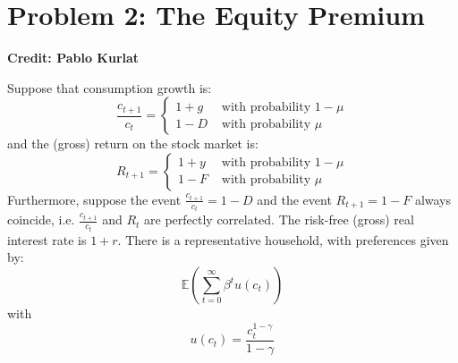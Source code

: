 \documentclass[11pt]{extarticle}
\theoremstyle{plain}
\theoremstyle{definition}
\begin{document}
\vspace{10mm}
\section*{Problem 2: The Equity Premium}

\textbf{Credit: Pablo Kurlat} 

Suppose that consumption growth is:
$$
\frac{c_{t+1}}{c_t}=\left\{\begin{array}{cc}
1+g & \text { with probability } 1-\mu \\
1-D & \text { with probability } \mu
\end{array}\right.
$$
and the (gross) return on the stock market is:
$$
R_{t+1}=\left\{\begin{array}{cc}
1+y & \text { with probability } 1-\mu \\
1-F & \text { with probability } \mu
\end{array}\right.
$$
Furthermore, suppose the event $\frac{c_{t+1}}{c_t}=1-D$ and the event $R_{t+1}=1-F$ always coincide, i.e. $\frac{c_{t+1}}{c_t}$ and $R_t$ are perfectly correlated. The risk-free (gross) real interest rate is $1+r$.
There is a representative household, with preferences given by:
$$
\mathbb{E}\left(\sum_{t=0}^{\infty} \beta^t u\left(c_t\right)\right)
$$
with
$$
u\left(c_t\right)=\frac{c_t^{1-\gamma}}{1-\gamma}
$$
\end{document}
